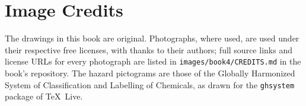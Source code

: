 \chapter*{Image Credits}

The drawings in this book are original. Photographs, where used, are used
under their respective free licenses, with thanks to their authors; full
source links and license URLs for every photograph are listed in
\texttt{images/book4/CREDITS.md} in the book's repository.
The hazard pictograms are those of the Globally Harmonized System of
Classification and Labelling of Chemicals, as drawn for the
\texttt{ghsystem} package of \TeX\ Live.

